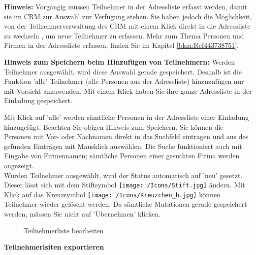 \textbf{Hinweis:} Vorgängig müssen Teilnehmer in der Adressliste erfasst werden, damit sie im CRM zur Auswahl zur Verfügung stehen. Sie haben jedoch die Möglichkeit, von der Teilnehmerverwaltung des CRM mit einem Klick direkt in die Adressliste zu wechseln , um neue Teilnehmer zu erfassen. Mehr zum Thema Personen und Firmen in der Adressliste erfassen, finden Sie im Kapitel \ref{bkm:Ref443738751}.

\vspace{\baselineskip}

\textbf{Hinweis zum Speichern beim Hinzufügen von Teilnehmern:} Werden Teilnehmer ausgewählt, wird diese Auswahl gerade gespeichert. Deshalb ist die Funktion 'alle' Teilnehmer  (alle Personen aus der Adressliste) hinzuzufügen nur mit Vorsicht anzuwenden. Mit einem Klick haben Sie ihre ganze Adressliste in der Einladung gespeichert.

\vspace{\baselineskip}

Mit Klick auf 'alle'  werden sämtliche Personen in der Adressliste einer Einladung hinzugefügt. Beachten Sie obigen Hinweis zum Speichern. Sie können die Personen mit Vor- oder Nachnamen direkt in das Suchfeld  eintragen und aus des gefunden Einträgen mit Mausklick auswählen. Die Suche funktioniert auch mit Eingabe von Firmennamen; sämtliche Personen einer gesuchten Firma werden angezeigt. \\
Wurden Teilnehmer ausgewählt, wird der Status automatisch auf 'neu' gesetzt. Dieser lässt sich mit dem Stiftsymbol \texttt{[image: /Icons/Stift.jpg]}  ändern. Mit Klick auf das Kreuzsymbol \texttt{[image: /Icons/Kreuzchen\_b.jpg]}  können Teilnehmer wieder gelöscht werden. Da sämtliche Mutationen gerade gespeichert werden, müssen Sie nicht auf 'Übernehmen' klicken.

\begin{figure}[H]
\caption{Teilnehmerliste bearbeiten}
\end{figure}

\textbf{Teilnehmerlsiten exportieren}

